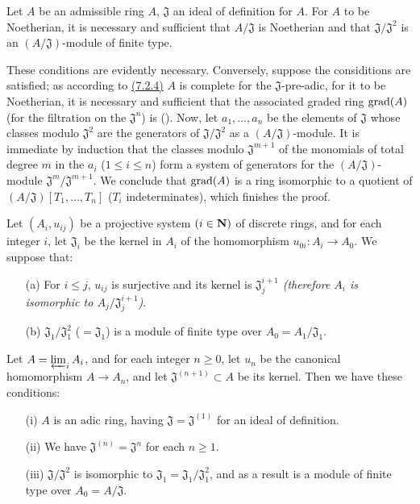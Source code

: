 \begin{cor}[7.2.6]
\label{cor-0.7.2.6}
Let $A$ be an admissible ring $A$, $\mathfrak{J}$ an ideal of definition for
$A$. For $A$ to be Noetherian, it is necessary and sufficient that
$A/\mathfrak{J}$ is Noetherian and that $\mathfrak{J}/\mathfrak{J}^2$ is an
$(A/\mathfrak{J})$-module of finite type.
\end{cor}

These conditions are evidently necessary. Conversely, suppose the considitions
are satisfied; as according to \hyperref[prop-0.7.2.4]{(7.2.4)} $A$ is complete for the
$\mathfrak{J}$-pre-adic, for it to be Noetherian, it is necessary and sufficient
that the associated graded ring ${\mathop{\mathrm{grad}}\nolimits}(A)$ (for the filtration on the
$\mathfrak{J}^n$) is (\cite[p~.18--07, th.~4]{I-1}). Now, let $a_1,\dots,a_n$ be
the elements of $\mathfrak{J}$ whose classes modulo $\mathfrak{J}^2$ are the
generators of $\mathfrak{J}/\mathfrak{J}^2$ as a $(A/\mathfrak{J})$-module. It
is immediate by induction that the classes modulo $\mathfrak{J}^{m+1}$ of the
monomials of total degree $m$ in the $a_i$ ($1\leqslant i\leqslant n$) form a
system of generators for the $(A/\mathfrak{J})$-module
$\mathfrak{J}^m/\mathfrak{J}^{m+1}$. We conclude that ${\mathop{\mathrm{grad}}\nolimits}(A)$ is a ring
isomorphic to a quotient of $(A/\mathfrak{J})[T_1,\dots,T_n]$ ($T_i$
indeterminates), which finishes the proof.

\begin{prop}[7.2.7]
\label{prop-0.7.2.7}
Let $(A_i,u_{ij})$ be a projective system $(i\in\mathbf{N})$ of discrete rings, and
for each integer $i$, let $\mathfrak{J}_i$ be the kernel in $A_i$ of the
homomorphism $u_{0i}:A_i\to A_0$. We suppose that:
\begin{itemize}
  \item[{\rm(a)}] For $i\leqslant j$, $u_{ij}$ is surjective and its kernel is $\mathfrak{J}_j^{i+1}$
    {\em (therefore $A_i$ is isomorphic to $A_j/\mathfrak{J}_j^{i+1}$)}.
  \item[{\rm(b)}] $\mathfrak{J}_1/\mathfrak{J}_1^2$ ($=\mathfrak{J}_1$) is a module of
    finite type over $A_0=A_1/\mathfrak{J}_1$.
\end{itemize}
Let $A=\varprojlim_i A_i$, and for each integer $n\geqslant 0$, let $u_n$ be the
canonical homomorphism $A\to A_n$, and let $\mathfrak{J}^{(n+1)}\subset A$ be
its kernel. Then we have these conditions:
\begin{itemize}
  \item[{\rm(i)}] $A$ is an adic ring, having $\mathfrak{J}=\mathfrak{J}^{(1)}$ for an
    ideal of definition.
  \item[{\rm(ii)}] We have $\mathfrak{J}^{(n)}=\mathfrak{J}^n$ for each $n\geqslant 1$.
  \item[{\rm(iii)}] $\mathfrak{J}/\mathfrak{J}^2$ is isomorphic to
    $\mathfrak{J}_1=\mathfrak{J}_1/\mathfrak{J}_1^2$, and as a result is a module of finite type
    over $A_0=A/\mathfrak{J}$.
\end{itemize}
\end{prop}


